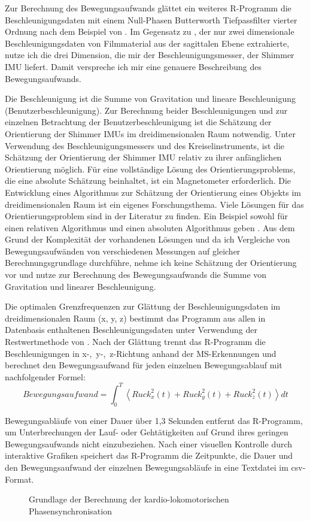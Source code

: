 Zur Berechnung des Bewegungsaufwands glättet ein weiteres R-Programm die Beschleunigungsdaten mit einem Null-Phasen Butterworth Tiefpassfilter vierter Ordnung nach dem Beispiel von \citet{Hreljac2000}. Im Gegensatz zu \citet{Hreljac2000}, der nur zwei dimensionale Beschleunigungsdaten von Filmmaterial aus der sagittalen Ebene extrahierte, nutze ich die drei Dimension, die mir der Beschleunigungsmesser, der Shimmer \ac{IMU} liefert. Damit verspreche ich mir eine genauere Beschreibung des Bewegungsaufwands.

Die Beschleunigung ist die Summe von Gravitation und lineare Beschleunigung (Benutzerbeschleunigung). Zur Berechnung beider Beschleunigungen und zur einzelnen Betrachtung der Benutzerbeschleunigung ist die Schätzung der Orientierung der Shimmer \acp{IMU} im dreidimensionalen Raum notwendig. Unter Verwendung des Beschleunigungsmessers und des Kreiselinstruments, ist die Schätzung der Orientierung der Shimmer \ac{IMU} relativ zu ihrer anfänglichen Orientierung möglich. Für eine vollständige Lösung des Orientierungsproblems, die eine absolute Schätzung beinhaltet, ist ein Magnetometer erforderlich. Die Entwicklung eines Algorithmus zur Schätzung der Orientierung eines Objekts im dreidimensionalen Raum ist ein eigenes Forschungsthema. Viele Lösungen für das Orientierungsproblem sind in der Literatur zu finden. Ein Beispiel sowohl für einen relativen Algorithmus und einen absoluten Algorithmus geben \citet{Madgwick2011}. Aus dem Grund der Komplexität der vorhandenen Lösungen und da ich Vergleiche von Bewegungsaufwänden von verschiedenen Messungen auf gleicher Berechnungsgrundlage durchführe, nehme ich keine Schätzung der Orientierung vor und nutze zur Berechnung des Bewegungsaufwands die Summe von Gravitation und linearer Beschleunigung.

Die optimalen Grenzfrequenzen zur Glättung der Beschleunigungsdaten im dreidimensionalen Raum (x, y, z) bestimmt das Programm aus allen in Datenbasis enthaltenen Beschleunigungsdaten unter Verwendung der Restwertmethode von \citet{Wells1980}. Nach der Glättung trennt das R-Programm die Beschleunigungen in \mbox{x-, y-, z-Richtung} anhand der \ac{MS}-Erkennungen und berechnet den Bewegungsaufwand für jeden einzelnen Bewegungsablauf mit nachfolgender Formel: 
\begin{equation}
	Bewegungsaufwand = \int^T_0 \left\langle {Ruck^2_{x}(t) + Ruck^2_{y}(t) + Ruck^2_{z}(t)}\right\rangle dt 
\end{equation}

Bewegungsabläufe von einer Dauer über 1,3 Sekunden entfernt das R-Programm, um Unterbrechungen der Lauf- oder Gehtätigkeiten auf Grund ihres geringen Bewegungsaufwands nicht einzubeziehen. Nach einer visuellen Kontrolle durch interaktive Grafiken speichert das R-Programm die Zeitpunkte, die Dauer und den Bewegungsaufwand der einzelnen Bewegungsabläufe in eine Textdatei im \acs{csv}-Format. 
\begin{figure}
	[!htb]  \caption[Grundlage der Berechnung der kardio-lokomotorischen Phasensynchronisation]{Grundlage der Berechnung der kardio-lokomotorischen Phasensynchronisation} \label{fig:grundlage_klps} 
\end{figure}

